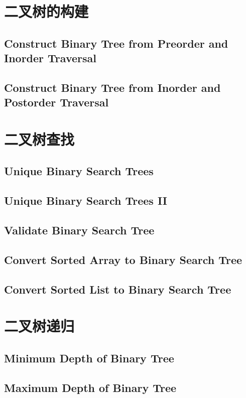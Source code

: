 \documentclass[11pt]{book}
\begin{document}
\section{二叉树的构建}
\label{sec-4-2}
\subsection{Construct Binary Tree from Preorder and Inorder Traversal}
\label{sec-4-2-1}
\subsection{Construct Binary Tree from Inorder and Postorder Traversal}
\label{sec-4-2-2}
\section{二叉树查找}
\label{sec-4-3}
\subsection{Unique Binary Search Trees}
\label{sec-4-3-1}
\subsection{Unique Binary Search Trees II}
\label{sec-4-3-2}
\subsection{Validate Binary Search Tree}
\label{sec-4-3-3}
\subsection{Convert Sorted Array to Binary Search Tree}
\label{sec-4-3-4}
\subsection{Convert Sorted List to Binary Search Tree}
\label{sec-4-3-5}
\section{二叉树递归}
\label{sec-4-4}
\subsection{Minimum Depth of Binary Tree}
\label{sec-4-4-1}
\subsection{Maximum Depth of Binary Tree}
\label{sec-4-4-2}
\end{document}
